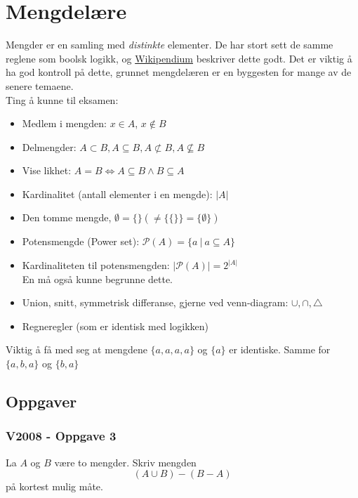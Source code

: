 \section{Mengdelære}

Mengder er en samling med \textit{distinkte} elementer. De har stort sett de samme reglene
som boolsk logikk, og \href{https://www.wikipendium.no/MA0301_Elementary_Discrete_Mathematics#sets}{Wikipendium} beskriver dette godt.
Det er viktig å ha god kontroll på dette, grunnet mengdelæren er en byggesten for mange av de senere temaene.\\
Ting å kunne til eksamen:
\begin{itemize}
    \item Medlem i mengden: \(x\in A\), \(x\not\in B\)
    \item Delmengder: \(A \subset B, A\subseteq B, A\not\subset B, A \not\subseteq B\)
    \item Vise likhet: \(A=B \Leftrightarrow A\subseteq B \land B \subseteq A\)
    \item Kardinalitet (antall elementer i en mengde): \(|A|\)
    \item Den tomme mengde, \(\emptyset = \{\} \left(\neq \{\{\}\} = \{\emptyset\}\right)\)
    \item Potensmengde (Power set): \(\mathcal{P}(A) = \{a ~|~ a \subseteq A\}\)
    \item Kardinaliteten til potensmengden: \(|\mathcal{P}(A)| = 2^{|A|}\)\\
    En må også kunne begrunne dette.
    \item Union, snitt, symmetrisk differanse, gjerne ved venn-diagram: \(\cup, \cap, \triangle\)
    \item Regneregler (som er identisk med logikken)
\end{itemize}

\noindent Viktig å få med seg at mengdene \(\{a, a, a, a\}\) og \(\{a\}\) er identiske. Samme for \(\{a, b, a\}\) og \(\{b, a\}\)

\subsection{Oppgaver}

\subsubsection{V2008 - Oppgave 3}
La $A$ og $B$ være to mengder. Skriv mengden
\[
(A\cup B)-(B-A)    
\]
på kortest mulig måte.

